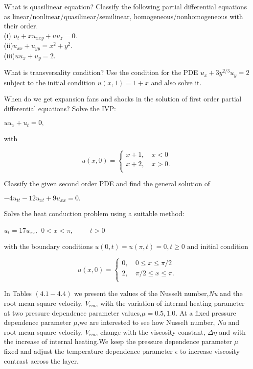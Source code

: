 \documentclass[12pt,a4paper]{exam}
\newcommand{\Hs}{\hspace{1cm}}
\begin{document}
\begin{questions}
	\question[6] What is quasilinear equation? Classify the following partial differential equations as linear/nonlinear/quasilinear/semilinear, homogeneous/nonhomogeneous with their order.\\
	(i) $u_t+xu_{xxy}+uu_{z}=0.$\\
	(ii)$u_{xx}+u_{yy}=x^2+y^2.$\\
	(iii)$uu_x+u_y=2.$
	
	\question[5] What is transversality condition? Use the condition for the PDE $u_x+3y^{2/3}u_y=2$ subject to the initial condition $u(x,1)=1+x$ and also solve it. 
	
	\question[1+4] When do we get expansion fans and shocks in the solution of first order partial differential equations? Solve the IVP:\\
		\begin{center}
			$uu_x+u_t=0,$ 
		\end{center}with\\
		\begin{center}
			\[  u(x,0)= \left\{
				\begin{array}{cc}
					x+1,& \ x<0 \\
					x+2,& \ x>0. \\
				\end{array} 
			\right. \]
		\end{center}
	\question[4]Classify the given second order PDE and find the general solution of\\
	\begin{center}
		$-4u_{tt}-12u_{xt}+9u_{xx}=0.$
	\end{center}
	\question[5] Solve the heat conduction problem using a suitable method:
	\begin{center}
		$u_t=17u_{xx},$ \Hs $0<x<\pi ,\Hs t>0$ 
	\end{center}
	with the boundary conditions $u(0,t)=u(\pi,t)=0,t\ge 0$ and initial condition 
	\begin{center}
		\[  u(x,0)= \left\{
		\begin{array}{cc}
		0,& \ 0\le x\le \pi /2 \\
		2,& \ \pi/2\le x\le \pi. \\
		\end{array} 
		\right. \]
	\end{center}
	
\end{questions}


\pagebreak
	\noindent In Tables $ (4.1-4.4) $ we present the values of the Nusselt number,\textit{Nu} and the root mean square velocity, $V_{rms}$ with the variation of internal heating parameter at two pressure dependence parameter values,$\mu=0.5,1.0$. At a fixed pressure dependence parameter $\mu$,we are interested to see how Nusselt number, \textit{Nu} and root mean square velocity, $V_{rms}$ change with the viscosity constant, $\Delta\eta$ and with the increase of internal heating.We keep the pressure dependence parameter $\mu$ fixed and adjust the temperature dependence parameter $\epsilon$ to increase viscosity contrast across the layer. \\
\end{document}
